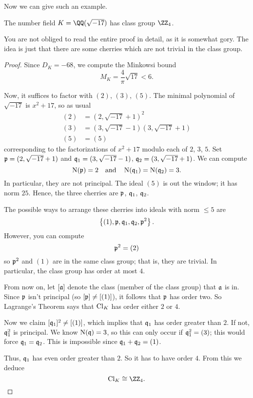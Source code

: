 Now we can give such an example.
\begin{proposition}
	The number field $K = \QQ(\sqrt{-17})$ has class group $\Zc 4$.
\end{proposition}
You are not obliged to read the entire proof in detail,
as it is somewhat gory.
The idea is just that there are some cherries which are not trivial in the class group.
\begin{proof}
Since $D_K = -68$, we compute
the Minkowsi bound
\[ M_K = \frac{4}{\pi} \sqrt{17} < 6. \]

Now, it suffices to factor with $(2)$, $(3)$, $(5)$.
The minimal polynomial of $\sqrt{-17}$ is $x^2+17$, so as usual
\begin{align*}
	(2) &= (2, \sqrt{-17}+1)^2 \\
	(3) &= (3, \sqrt{-17}-1)(3,\sqrt{-17}+1) \\
	(5) &= (5)
\end{align*}
corresponding to the factorizations of $x^2+17$ modulo each of $2$, $3$, $5$.
Set $\pp = (2, \sqrt{-17}+1)$ and $\qq_1 = (3, \sqrt{-17}-1)$, $\qq_2 = (3, \sqrt{-17}+1)$.
We can compute
\[ \Norm(\pp) = 2 \quad\text{and}\quad \Norm(\qq_1) = \Norm(\qq_2) = 3. \]
In particular, they are not principal.
The ideal $(5)$ is out the window; it has norm $25$.
Hence, the three cherries are $\pp$, $\qq_1$, $\qq_2$.

The possible ways to arrange these cherries into ideals with norm $\le 5$ are
\[ \left\{ (1), \pp, \qq_1, \qq_2, \pp^2 \right\}. \]
However, you can compute \[ \pp^2 = (2) \] so $\pp^2$ and $(1)$ are in the same class group;
that is, they are trivial.
In particular, the class group has order at most $4$.

From now on, let $[\aa]$ denote the class (member of the class group) that $\aa$ is in.
Since $\pp$ isn't principal (so $[\pp] \neq [(1)]$), it follows that $\pp$ has order two.
So Lagrange's Theorem says that $\Cl_K$ has order either $2$ or $4$.

Now we claim $[\qq_1]^2 \neq [(1)]$, which implies that $\qq_1$ has order greater than $2$.
If not, $\qq_1^2$ is principal.
We know $\Norm(\qq) = 3$,
so this can only occur if $\qq_1^2 = (3)$;
this would force $\qq_1 = \qq_2$.
This is impossible since $\qq_1 + \qq_2 = (1)$.

Thus, $\qq_1$ has even order greater than $2$.
So it has to have order $4$.
From this we deduce \[ \Cl_K \cong \Zc 4. \qedhere \]
\end{proof}




